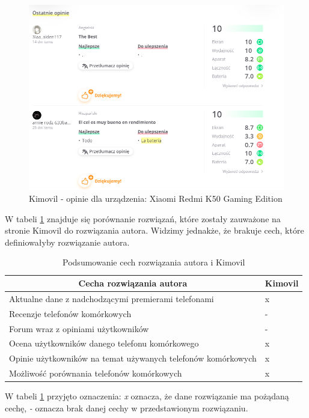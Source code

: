 \begin{figure}[H]
    \centering
    \includegraphics[scale=0.5]{img/Kimovil/opinieKimovil.png}
    \caption{Kimovil - opinie dla urządzenia: Xiaomi Redmi K50 Gaming Edition}
    \label{kimovil_4}
\end{figure}
W tabeli \ref*{comparison_kimovil} znajduje się porównanie rozwiązań, które zostały zauważone na stronie Kimovil do rozwiązania autora. Widzimy jednakże, że brakuje cech, które definiowałyby rozwiązanie autora.
\begin{table}
    \centering
    \begin{tabular}{|l|l|}
        \hline
        \multicolumn{1}{|c|}{Cecha rozwiązania autora}    & \multicolumn{1}{c|}{Kimovil} \\ \hline
        Aktualne dane z nadchodzącymi premierami telefonami & x                             \\ \hline
        Recenzje telefonów komórkowych                                  & -                                \\ \hline
        Forum wraz z opiniami użytkowników                   & -                                \\ \hline
        Ocena użytkowników danego telefonu komórkowego                  & x                             \\ \hline
        Opinie użytkowników na temat używanych telefonów komórkowych    & x                                 \\ \hline
        Możliwość porównania telefonów komórkowych                      & x                                \\ \hline
    \end{tabular}
    \caption{Podsumowanie cech rozwiązania autora i Kimovil}
    \label{comparison_kimovil}
\end{table}
W tabeli \ref*{comparison_kimovil} przyjęto oznaczenia: \textit{x} oznacza, że dane rozwiązanie ma pożądaną cechę, \textit{-} oznacza brak danej cechy w przedstawionym rozwiązaniu.

